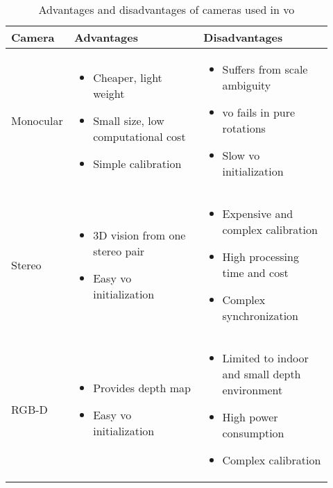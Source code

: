 \begin{table}[h!]
	\centering
	\begin{tabular}[c]{ |m{0.12\linewidth} | m{0.40\linewidth} | m{0.40\linewidth} |}
		\hline 
		\textbf{Camera} & \textbf{Advantages}  & \textbf{Disadvantages} \\ [1ex] \hline
		Monocular & \begin{itemize} 
				 		\item Cheaper, light weight
						\item Small size, low computational cost 
						\item Simple calibration 
				   \end{itemize} & 
			       \begin{itemize} 
			       	\item Suffers from scale ambiguity
			       	\item \acrshort{vo} fails in pure rotations
			       	\item Slow \acrshort{vo} initialization
			       \end{itemize} \\ \hline
		Stereo & \begin{itemize} 
					\item 3D vision from one stereo pair
					\item Easy \acrshort{vo} initialization
				\end{itemize} & 
				\begin{itemize} 
					\item Expensive and complex calibration
					\item High processing time and cost
					\item Complex synchronization
				\end{itemize} \\ \hline
		RGB-D  & \begin{itemize} 
					\item Provides depth map 
					\item Easy \acrshort{vo} initialization
				\end{itemize} & 
				\begin{itemize} 
					\item Limited to indoor and small depth environment
					\item High power consumption
					\item Complex calibration
				\end{itemize} \\ \hline
	\end{tabular}
	\caption{Advantages and disadvantages of cameras used in \acrshort{vo}}
	\label{table:cameracomp}  
\end{table}
